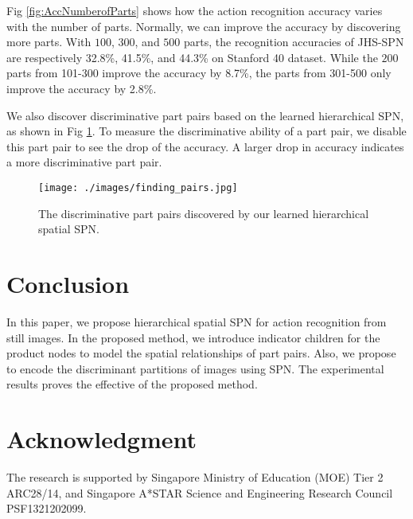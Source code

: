 \documentclass[journal]{IEEEtran}
\begin{document}
Fig \ref{fig:AccNumberofParts} shows how the action recognition accuracy varies with the number of parts. Normally, we can improve the accuracy by discovering more parts. With $ 100 $, $ 300 $, and $ 500 $ parts, the recognition accuracies of JHS-SPN are respectively 32.8\%, 41.5\%, and 44.3\% on Stanford 40 dataset. While the $ 200 $ parts from 101-300 improve the accuracy by 8.7\%, the parts from 301-500 only improve the accuracy by 2.8\%.


We also discover discriminative part pairs based on the learned hierarchical SPN, as shown in Fig \ref{fig:finding_pairs}. To measure the discriminative ability of a part pair, we disable this part pair to see the drop of the accuracy. A larger drop in accuracy indicates a more discriminative part pair.



\begin{figure}[htb]
	\begin{center}
		\texttt{[image: ./images/finding\_pairs.jpg]}
	\end{center}
	\caption{The discriminative part pairs discovered by our learned hierarchical spatial SPN.}
	\label{fig:finding_pairs}
\end{figure}



\section{Conclusion}
\label{Sec:Conclusion}

In this paper, we propose hierarchical spatial SPN for action recognition from still images. In the proposed method, we introduce indicator children for the product nodes to model the spatial relationships of part pairs. Also, we propose to encode the discriminant partitions of images using SPN. The experimental results proves the effective of the proposed method.












\section*{Acknowledgment}
The research is supported by Singapore Ministry of Education (MOE) Tier 2 ARC28/14, and Singapore A*STAR Science and Engineering Research Council PSF1321202099.
\end{document}
